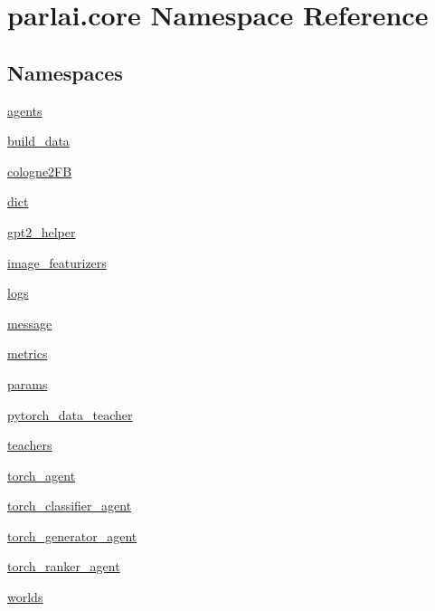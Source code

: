 \hypertarget{namespaceparlai_1_1core}{}\section{parlai.\+core Namespace Reference}
\label{namespaceparlai_1_1core}
\subsection*{Namespaces}
\begin{DoxyCompactItemize}
\item 
 \hyperlink{namespaceparlai_1_1core_1_1agents}{agents}
\item 
 \hyperlink{namespaceparlai_1_1core_1_1build__data}{build\+\_\+data}
\item 
 \hyperlink{namespaceparlai_1_1core_1_1cologne2FB}{cologne2\+FB}
\item 
 \hyperlink{namespaceparlai_1_1core_1_1dict}{dict}
\item 
 \hyperlink{namespaceparlai_1_1core_1_1gpt2__helper}{gpt2\+\_\+helper}
\item 
 \hyperlink{namespaceparlai_1_1core_1_1image__featurizers}{image\+\_\+featurizers}
\item 
 \hyperlink{namespaceparlai_1_1core_1_1logs}{logs}
\item 
 \hyperlink{namespaceparlai_1_1core_1_1message}{message}
\item 
 \hyperlink{namespaceparlai_1_1core_1_1metrics}{metrics}
\item 
 \hyperlink{namespaceparlai_1_1core_1_1params}{params}
\item 
 \hyperlink{namespaceparlai_1_1core_1_1pytorch__data__teacher}{pytorch\+\_\+data\+\_\+teacher}
\item 
 \hyperlink{namespaceparlai_1_1core_1_1teachers}{teachers}
\item 
 \hyperlink{namespaceparlai_1_1core_1_1torch__agent}{torch\+\_\+agent}
\item 
 \hyperlink{namespaceparlai_1_1core_1_1torch__classifier__agent}{torch\+\_\+classifier\+\_\+agent}
\item 
 \hyperlink{namespaceparlai_1_1core_1_1torch__generator__agent}{torch\+\_\+generator\+\_\+agent}
\item 
 \hyperlink{namespaceparlai_1_1core_1_1torch__ranker__agent}{torch\+\_\+ranker\+\_\+agent}
\item 
 \hyperlink{namespaceparlai_1_1core_1_1worlds}{worlds}
\end{DoxyCompactItemize}
